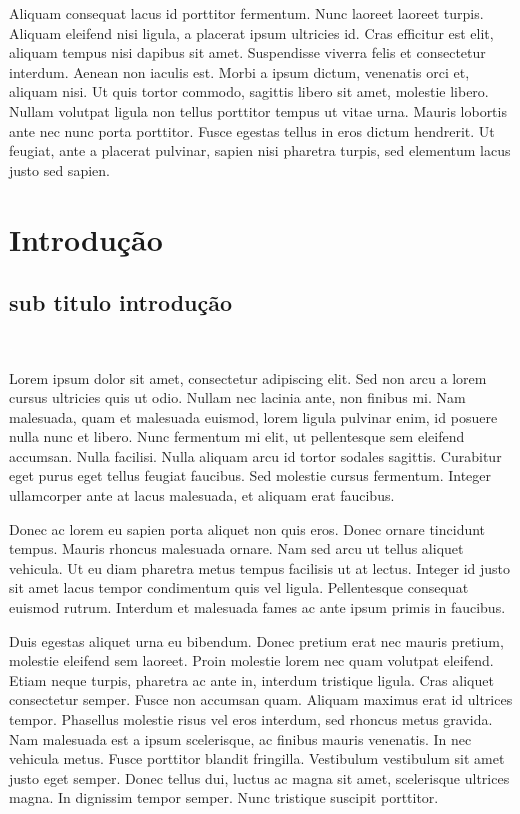 \documentclass[11pt, a4paper]{article} %
\begin{document}
Aliquam consequat lacus id porttitor fermentum. Nunc laoreet laoreet turpis. Aliquam eleifend nisi ligula, a placerat ipsum ultricies id. Cras efficitur est elit, aliquam tempus nisi dapibus sit amet. Suspendisse viverra felis et consectetur interdum. Aenean non iaculis est. Morbi a ipsum dictum, venenatis orci et, aliquam nisi. Ut quis tortor commodo, sagittis libero sit amet, molestie libero. Nullam volutpat ligula non tellus porttitor tempus ut vitae urna. Mauris lobortis ante nec nunc porta porttitor. Fusce egestas tellus in eros dictum hendrerit. Ut feugiat, ante a placerat pulvinar, sapien nisi pharetra turpis, sed elementum lacus justo sed sapien.


\newpage

\section{Introdução} %
\subsection{sub titulo introdução} %
\textcolor{white}{.}\par
 Lorem ipsum dolor sit amet, consectetur adipiscing elit. Sed non arcu a lorem cursus ultricies quis ut odio. Nullam nec lacinia ante, non finibus mi. Nam malesuada, quam et malesuada euismod, lorem ligula pulvinar enim, id posuere nulla nunc et libero. Nunc fermentum mi elit, ut pellentesque sem eleifend accumsan. Nulla facilisi. Nulla aliquam arcu id tortor sodales sagittis. Curabitur eget purus eget tellus feugiat faucibus. Sed molestie cursus fermentum. Integer ullamcorper ante at lacus malesuada, et aliquam erat faucibus.

Donec ac lorem eu sapien porta aliquet non quis eros. Donec ornare tincidunt tempus. Mauris rhoncus malesuada ornare. Nam sed arcu ut tellus aliquet vehicula. Ut eu diam pharetra metus tempus facilisis ut at lectus. Integer id justo sit amet lacus tempor condimentum quis vel ligula. Pellentesque consequat euismod rutrum. Interdum et malesuada fames ac ante ipsum primis in faucibus.

Duis egestas aliquet urna eu bibendum. Donec pretium erat nec mauris pretium, molestie eleifend sem laoreet. Proin molestie lorem nec quam volutpat eleifend. Etiam neque turpis, pharetra ac ante in, interdum tristique ligula. Cras aliquet consectetur semper. Fusce non accumsan quam. Aliquam maximus erat id ultrices tempor. Phasellus molestie risus vel eros interdum, sed rhoncus metus gravida. Nam malesuada est a ipsum scelerisque, ac finibus mauris venenatis. In nec vehicula metus. Fusce porttitor blandit fringilla. Vestibulum vestibulum sit amet justo eget semper. Donec tellus dui, luctus ac magna sit amet, scelerisque ultrices magna. In dignissim tempor semper. Nunc tristique suscipit porttitor.
\end{document}
